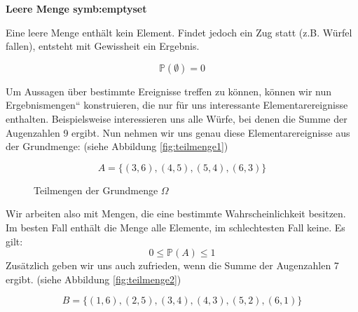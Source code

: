 {    \textbf{Leere Menge \gls{symb:emptyset}}

    Eine leere Menge enthält kein Element. Findet jedoch ein Zug statt (z.B.
    Würfel fallen), entsteht mit Gewissheit ein Ergebnis.

    \begin{equation*}
        \mathbb{P}\left({\emptyset}\right)=0
    \end{equation*}

    Um Aussagen über bestimmte Ereignisse treffen zu können, können wir nun
    {\quotedblbase}Ergebnismengen{\textquotedblleft} konstruieren, die nur
    für uns interessante Elementarereignisse enthalten. Beispielsweise
    interessieren uns alle Würfe, bei denen die Summe der Augenzahlen 9
    ergibt. Nun nehmen wir uns genau diese Elementarereignisse aus der
    Grundmenge: (siehe Abbildung \ref{fig:teilmenge1})

    \begin{equation*}
        A=\{\left(3,6\right),\left(4,5\right),\left(5,4\right),\left(6,3\right)\}
    \end{equation*}

    \begin{figure}
    \label{fig:teilmengen}
    \caption{Teilmengen der Grundmenge $\Omega$}
    \end{figure}

    Wir arbeiten also mit Mengen, die eine bestimmte Wahrscheinlichkeit
    besitzen. Im besten Fall enthält die Menge alle Elemente, im
    schlechtesten Fall keine. Es gilt:
    \begin{equation*}
        0\le \mathbb{P}\left(A\right)\le 1
    \end{equation*}
    Zusätzlich geben wir uns auch zufrieden, wenn die Summe der Augenzahlen 7 ergibt. (siehe Abbildung \ref{fig:teilmenge2})

    \begin{equation*}
        B=\{\left(1,6\right),\left(2,5\right),\left(3,4\right),\left(4,3\right),\left(5,2\right),\left(6,1\right)\}
    \end{equation*}

}
